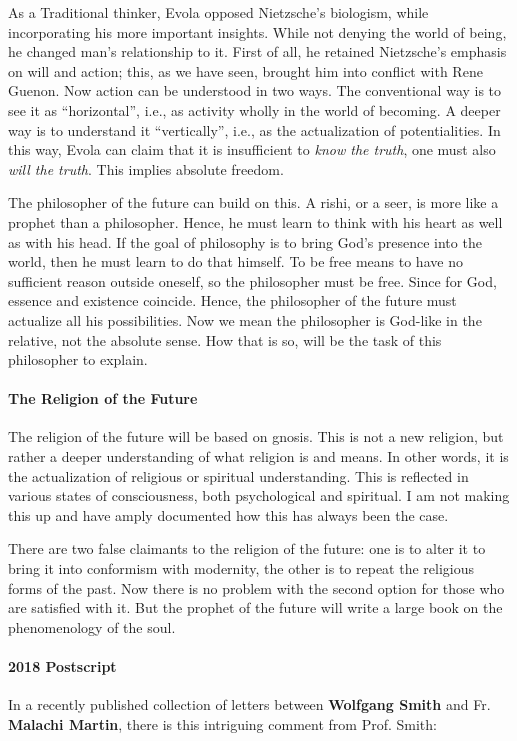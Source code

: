 As a Traditional thinker, Evola opposed Nietzsche's biologism, while incorporating his more important
insights. While not denying the world of being, he changed man's relationship to it. First of all, he
retained Nietzsche's emphasis on will and action; this, as we have seen, brought him into conflict with
Rene Guenon. Now action can be understood in two ways. The conventional way is to see it as “horizontal”, i.e., as
activity wholly in the world of becoming. A deeper way is to understand it “vertically”, i.e., as the actualization of
potentialities. In this way, Evola can claim that it is insufficient to \emph{know the truth}, one must also \emph{will
the truth}. This implies absolute freedom.

The philosopher of the future can build on this. A rishi, or a seer, is more like a prophet than a philosopher. Hence,
he must learn to think with his heart as well as with his head. If the goal of philosophy is to bring God's
presence into the world, then he must learn to do that himself. To be free means to have no sufficient reason outside
oneself, so the philosopher must be free. Since for God, essence and existence coincide. Hence, the philosopher of the
future must actualize all his possibilities. Now we mean the philosopher is God-like in the relative, not the absolute
sense. How that is so, will be the task of this philosopher to explain.

\paragraph{The Religion of the Future}
The religion of the future will be based on gnosis. This is not a new religion, but rather a deeper understanding of
what religion is and means. In other words, it is the actualization of religious or spiritual understanding. This is
reflected in various states of consciousness, both psychological and spiritual. I am not making this up and have amply
documented how this has always been the case.

There are two false claimants to the religion of the future: one is to alter it to bring it into conformism with
modernity, the other is to repeat the religious forms of the past. Now there is no problem with the second option for
those who are satisfied with it. But the prophet of the future will write a large book on the phenomenology of the
soul.

\paragraph{2018 Postscript}
In a recently published collection of letters between \textbf{Wolfgang Smith} and Fr. \textbf{Malachi Martin}, there is
this intriguing comment from Prof. Smith:

